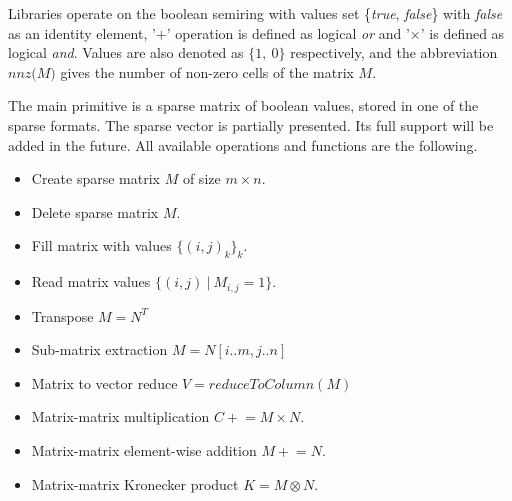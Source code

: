 Libraries operate on the boolean semiring with values set \{\textit{true}, \textit{false}\} with \textit{false} as an identity element, '$+$' operation is defined as logical \textit{or} and '$\times$' is defined as logical \textit{and}.
Values are also denoted as $\{1,~0\}$ respectively, and the abbreviation $\textit{nnz(M)}$ gives the number of non-zero cells of the matrix $M$.

The main primitive is a sparse matrix of boolean values, stored in one of the sparse formats.
The sparse vector is partially presented. 
Its full support will be added in the future. 
All available operations and functions are the following.


\begin{itemize}
    \item Create sparse matrix $M$ of size $m \times n$.
    \item Delete sparse matrix $M$.
    \item Fill matrix with values $\{(i,j)_k\}_k$.
    \item Read matrix values $\{(i, j)~|~M_{i,j} = 1\}$.
    \item Transpose $M = N^T$
    \item Sub-matrix extraction $M = N[i..m, j..n]$
    \item Matrix to vector reduce $V = \textit{reduceToColumn}(M)$
    \item Matrix-matrix multiplication $C \mathrel{+}= M \times N$.
    \item Matrix-matrix element-wise addition $M \mathrel{+}= N$.
    \item Matrix-matrix Kronecker product $K = M \otimes N$.
\end{itemize}